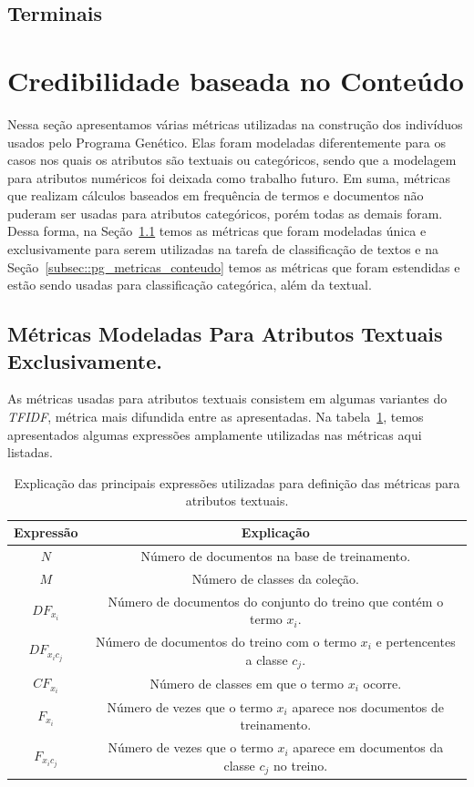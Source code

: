 \subsection{Terminais}

\section{Credibilidade baseada no Conteúdo}
\label{sec::pg_cred_baseada_conteudo}

Nessa seção apresentamos várias métricas utilizadas na construção dos indivíduos usados pelo Programa Genético. Elas foram modeladas diferentemente para os casos nos quais os atributos são textuais ou categóricos, sendo que a modelagem para atributos numéricos foi deixada como trabalho futuro. Em suma, métricas que realizam cálculos baseados em frequência de termos e documentos não puderam ser usadas para atributos categóricos, porém todas as demais foram. Dessa forma, na Seção~\ref{subsec::pg_metricas_conteudo_textual} temos as métricas que foram modeladas única e exclusivamente para serem utilizadas na tarefa de classificação de textos e na Seção~\ref{subsec::pg_metricas_conteudo} temos as métricas que foram estendidas e estão sendo usadas para classificação categórica, além da textual.

\subsection{Métricas Modeladas Para Atributos Textuais Exclusivamente.}
\label{subsec::pg_metricas_conteudo_textual}

As métricas usadas para atributos textuais consistem em algumas variantes do \textit{TFIDF}, métrica mais difundida entre as apresentadas. Na tabela~\ref{table::metricas_textuais}, temos apresentados algumas expressões amplamente utilizadas nas métricas aqui listadas.

\begin{table}[ht*]
\centering
\begin{tabular}{|c|c|}
\toprule
    \textbf{Expressão} & \textbf{Explicação} \\
\midrule
    $N$           & Número de documentos na base de treinamento. \tabularnewline \hline
    $M$           & Número de classes da coleção. \tabularnewline \hline
    $DF_{x_i} $   & Número de documentos do conjunto do treino que contém o termo $x_i$. \tabularnewline \hline
    $DF_{x_ic_j}$ & Número de documentos do treino com o termo $x_i$ e pertencentes a classe $c_j$. \tabularnewline \hline
    $CF_{x_i}$    & Número de classes em que o termo $x_i$ ocorre. \tabularnewline \hline 
    $F_{x_i}$     & Número de vezes que o termo $x_i$ aparece nos documentos de treinamento. \tabularnewline \hline
    $F_{x_ic_j}$  & Número de vezes que o termo $x_i$ aparece em documentos da classe $c_j$ no treino. \tabularnewline 
\bottomrule
\end{tabular}
\caption{Explicação das principais expressões utilizadas para definição das métricas para atributos textuais.}
\label{table::metricas_textuais}
\end{table}


